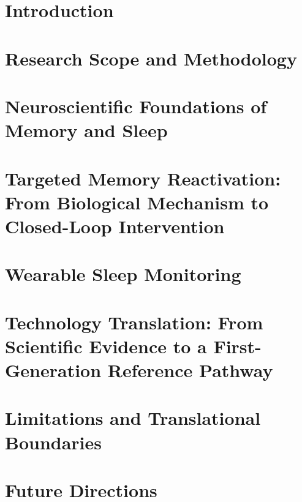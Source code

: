 \documentclass[pdflatex,sn-basic]{sn-jnl}
\theoremstyle{thmstyleone}
\theoremstyle{thmstyletwo}
\begin{document}

\maketitle

\section{Introduction}


\section{Research Scope and Methodology}


\section{Neuroscientific Foundations of Memory and Sleep}


\section{Targeted Memory Reactivation: From Biological Mechanism to Closed-Loop Intervention}


\section{Wearable Sleep Monitoring}


\section{Technology Translation:
From Scientific Evidence to a First-Generation Reference Pathway}


\section{Limitations and Translational Boundaries}


\section{Future Directions}

\end{document}
